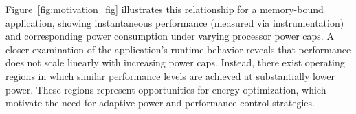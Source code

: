 Figure~\ref{fig:motivation_fig} illustrates this relationship for a memory-bound application, showing instantaneous performance (measured via instrumentation) and corresponding power consumption under varying processor power caps.
A closer examination of the application’s runtime behavior reveals that performance does not scale linearly with increasing power caps. Instead, there exist operating regions in which similar performance levels are achieved at substantially lower power. These regions represent opportunities for energy optimization, which  motivate the need for adaptive power and performance control strategies.
%
%
%



